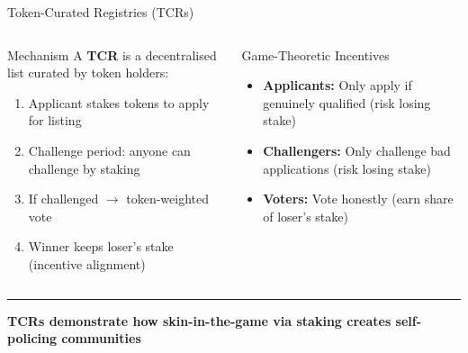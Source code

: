 \documentclass[8pt,aspectratio=169]{beamer}
\newcommand{\bottomnote}[1]{\vfill\vspace{-2mm}\textcolor{mllavender2}{\rule{\textwidth}{0.4pt}}\vspace{1mm}\footnotesize\textbf{#1}}
\begin{document}
\begin{frame}{Token-Curated Registries (TCRs)}
\begin{columns}[T]
\begin{block}{Mechanism}
\footnotesize
A \textbf{TCR} is a decentralised list curated by token holders:
\begin{enumerate}
  \item Applicant stakes tokens to apply for listing
  \item Challenge period: anyone can challenge by staking
  \item If challenged $\rightarrow$ token-weighted vote
  \item Winner keeps loser's stake (incentive alignment)
\end{enumerate}
\end{block}
\vspace{2mm}
\begin{block}{Game-Theoretic Incentives}
\footnotesize
\begin{itemize}
  \item \textbf{Applicants:} Only apply if genuinely qualified (risk losing stake)
  \item \textbf{Challengers:} Only challenge bad applications (risk losing stake)
  \item \textbf{Voters:} Vote honestly (earn share of loser's stake)
\end{itemize}
\end{block}

\end{columns}
\bottomnote{TCRs demonstrate how skin-in-the-game via staking creates self-policing communities}
\end{frame}
\end{document}
